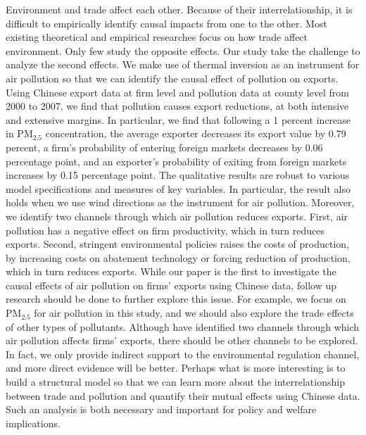 \documentclass[12pt]{article}
\begin{document}
    Environment and trade affect each other. Because of their interrelationship, it is difficult to empirically identify causal impacts from one to the other. Most existing theoretical and empirical researches focus on how trade affect environment. Only few study the opposite effects. Our study take the challenge to analyze the second effects. We make use of thermal inversion as an instrument for air pollution so that we can identify the causal effect of pollution on exports. Using Chinese export data at firm level and pollution data at county level from 2000 to 2007, we find that pollution causes export reductions, at both intensive and extensive margins. In particular, we find that following a 1 percent increase in $\mathrm{PM_{2.5}}$ concentration, the average exporter decreases its export value by 0.79 percent, a firm's probability of entering foreign markets decreases by 0.06 percentage point, and an exporter's probability of exiting from foreign markets increases by 0.15 percentage point. The qualitative results are robust to various model specifications and measures of key variables. In particular, the result also holds when we use wind directions as the instrument for air pollution. Moreover, we identify two channels through which air pollution reduces exports. First, air pollution has a negative effect on firm productivity, which in turn reduces exports. Second, stringent environmental policies raises the costs of production, by increasing costs on abatement technology or forcing reduction of production, which in turn reduces exports.
    While our paper is the first to investigate the causal effects of air pollution on firms' exports using Chinese data, follow up research should be done to further explore this issue. For example, we focus on $\mathrm{PM_{2.5}}$ for air pollution in this study, and we should also explore the trade effects of other types of pollutants. Although have identified two channels through which air pollution affects firms' exports, there should be other channels to be explored. In fact, we only provide indirect support to the environmental regulation channel, and more direct evidence will be better.
    Perhaps what is more interesting is to build a structural model so that we can learn more about the interrelationship between trade and pollution and quantify their mutual effects using Chinese data. Such an analysis is both necessary and important for policy and welfare implications.  

\newpage
\small


\end{document}
